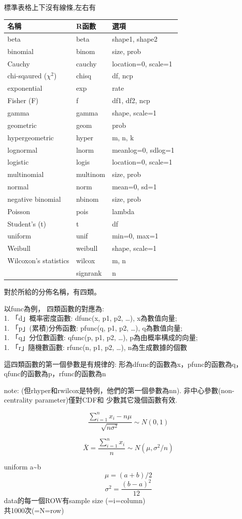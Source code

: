 \documentclass[]{book}
\theoremstyle{definition}
\theoremstyle{definition}
\theoremstyle{definition}
\theoremstyle{remark}
\begin{document}
標準表格上下沒有線條,左右有

\begin{longtable}[]{@{}lll@{}}
\toprule
名稱 & R函數 & 選項\tabularnewline
\midrule
\endhead
beta & beta & shape1, shape2\tabularnewline
binomial & binom & size, prob\tabularnewline
Cauchy & cauchy & location=0, scale=1\tabularnewline
chi-sqaured (\(\chi^2\)) & chisq & df, ncp\tabularnewline
exponential & exp & rate\tabularnewline
Fisher (F) & f & df1, df2, ncp\tabularnewline
gamma & gamma & shape, scale=1\tabularnewline
geometric & geom & prob\tabularnewline
hypergeometric & hyper & m, n, k\tabularnewline
lognormal & lnorm & meanlog=0, sdlog=1\tabularnewline
logistic & logis & location=0, scale=1\tabularnewline
multinomial & multinom & size, prob\tabularnewline
normal & norm & mean=0, sd=1\tabularnewline
negative binomial & nbinom & size, prob\tabularnewline
Poisson & pois & lambda\tabularnewline
Student's (t) & t & df\tabularnewline
uniform & unif & min=0, max=1\tabularnewline
Weibull & weibull & shape, scale=1\tabularnewline
Wilcoxon's statistics & wilcox & m, n\tabularnewline
& signrank & n\tabularnewline
\bottomrule
\end{longtable}

對於所給的分佈名稱，有四類。

以func為例， 四類函數的對應為:\\
1. 「d」概率密度函數: dfunc(x, p1, p2, \ldots{}), x為數值向量;\\
1. 「p」(累積)分佈函數: pfunc(q, p1, p2, \ldots{}), q為數值向量;\\
1. 「q」分位數函數: qfunc(p, p1, p2, \ldots{}), p為由概率構成的向量;\\
1. 「r」隨機數函數: rfunc(n, p1, p2, \ldots{}), n為生成數據的個數

這四類函數的第一個參數是有規律的:
形為dfunc的函數為x，pfunc的函數為q，qfunc的函數為p，rfunc的函數為n

note: (但rhyper和rwilcox是特例，他們的第一個參數為nn).
非中心參數(non-centrality parameter)僅對CDF和 少數其它幾個函數有效.

\[ \frac{{\sum\limits_{i = 1}^n {{x_i} - n\mu } }}{{\sqrt {n{\sigma ^2}} }} \sim  N(0,1) \]

\[ \bar X = \frac{{\sum_{i = 1}^n {{x_i} } }}{n} \sim  N(\mu, \sigma^2/n) \]

uniform a\textasciitilde{}b \[\mu = (a+b)/2\]
\[\sigma^2=\frac{(b-a)^2}{12} \] data的每一個ROW有sample size
(=i=column)\\
共1000次(=N=row)
\end{document}
